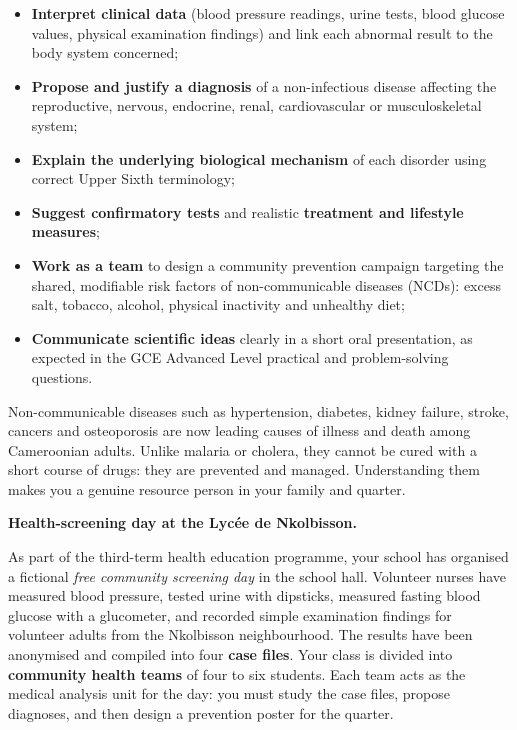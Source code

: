 \documentclass[11pt]{article}
\newcommand{\cle}[1]{{\popxbold\color{popdark}#1}}
\newcounter{popsec}
\newcounter{popsub}
\newcommand{\courssub}[1]{%
  \stepcounter{popsub}%
  \par\vspace{9pt}\noindent{\popxbold\fontsize{11.5}{13}\selectfont\color{popink}{\color{poporange}\thepopsec.\thepopsub}\hspace{6pt}#1}\par\nopagebreak\vspace{4pt}
}
\begin{document}
\begin{itemize}
\item \textbf{Interpret clinical data} (blood pressure readings, urine tests, blood glucose values, physical examination findings) and link each abnormal result to the body system concerned;
\item \textbf{Propose and justify a diagnosis} of a non-infectious disease affecting the reproductive, nervous, endocrine, renal, cardiovascular or musculoskeletal system;
\item \textbf{Explain the underlying biological mechanism} of each disorder using correct Upper Sixth terminology;
\item \textbf{Suggest confirmatory tests} and realistic \textbf{treatment and lifestyle measures};
\item \textbf{Work as a team} to design a community prevention campaign targeting the shared, modifiable risk factors of non-communicable diseases (NCDs): excess salt, tobacco, alcohol, physical inactivity and unhealthy diet;
\item \textbf{Communicate scientific ideas} clearly in a short oral presentation, as expected in the GCE Advanced Level practical and problem-solving questions.
\end{itemize}

\begin{aretenir}
Non-communicable diseases such as hypertension, diabetes, kidney failure, stroke, cancers and osteoporosis are now leading causes of illness and death among Cameroonian adults. Unlike malaria or cholera, they cannot be cured with a short course of drugs: they are \cle{prevented} and \cle{managed}. Understanding them makes you a genuine resource person in your family and quarter.
\end{aretenir}

\courssub{Situation}

\textbf{Health-screening day at the Lyc\'ee de Nkolbisson.}\par

As part of the third-term health education programme, your school has organised a fictional \emph{free community screening day} in the school hall. Volunteer nurses have measured blood pressure, tested urine with dipsticks, measured fasting blood glucose with a glucometer, and recorded simple examination findings for volunteer adults from the Nkolbisson neighbourhood. The results have been anonymised and compiled into four \textbf{case files}. Your class is divided into \textbf{community health teams} of four to six students. Each team acts as the medical analysis unit for the day: you must study the case files, propose diagnoses, and then design a prevention poster for the quarter.
\end{document}
